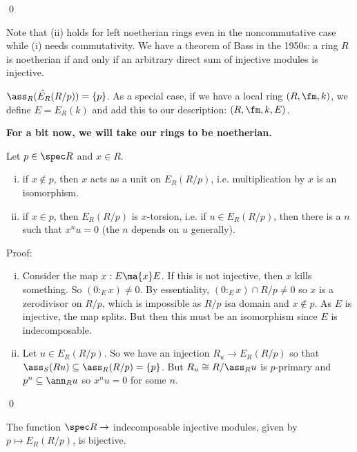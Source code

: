 \qed \\

\begin{rem}
Note that (ii) holds for left noetherian rings even in the noncommutative case while (i) needs commutativity. We have a theorem of Bass in the 1950s: a ring $R$ is noetherian if and only if an arbitrary direct sum of injective modules is injective. 
\end{rem}

\begin{cor}
$\hat{\ass_R(E_R(R/p))} = \{p\}$. As a special case, if we have a local ring $(R,\fm,k)$, we define $E=E_R(k)$ and add this to our description: $(R,\fm,k,E)$. 
\end{cor}

\textbf{For a bit now, we will take our rings to be noetherian.}

\begin{prop}
Let $p \in \spec R$ and $x \in R$.
\begin{enumerate}[(i)]
\item if $x \notin p$, then $x$ acts as a unit on $E_R(R/p)$, i.e. multiplication by $x$ is an isomorphism. 
\item if $x \in p$, then $E_R(R/p)$ is $x$-torsion, i.e. if $u \in E_R(R/p)$, then there is a $n$ such that $x^nu=0$ (the $n$ depends on $u$ generally). 
\end{enumerate}
\end{prop}

\noindent Proof:
\begin{enumerate}[(i)]
\item Consider the map $x: E \ma{x} E$. If this is not injective, then $x$ kills something. So $(0:_E x) \neq 0$. By essentiality, $(0:_E x) \cap R/p \neq 0$ so $x$ is a zerodivisor on $R/p$, which is impossible as $R/p$ isa  domain and $x \notin p$. As $E$ is injective, the map splits. But then this must be an isomorphism since $E$ is indecomposable. 

\item Let $u \in E_R(R/p)$. So we have an injection $R_u \to E_R(R/p)$ so that $\ass_S(Ru) \subseteq \ass_R(R/p)=\{p\}$. But $R_u \cong R/\ass_R u$ is $p$-primary and $p^n \subseteq \ann_R u$ so $x^nu=0$ for some $n$. 
\end{enumerate}
\qed \\

\begin{cor}
The function $\spec R \to $ indecomposable injective modules, given by $p \mapsto E_R(R/p)$, is bijective. 
\end{cor}

